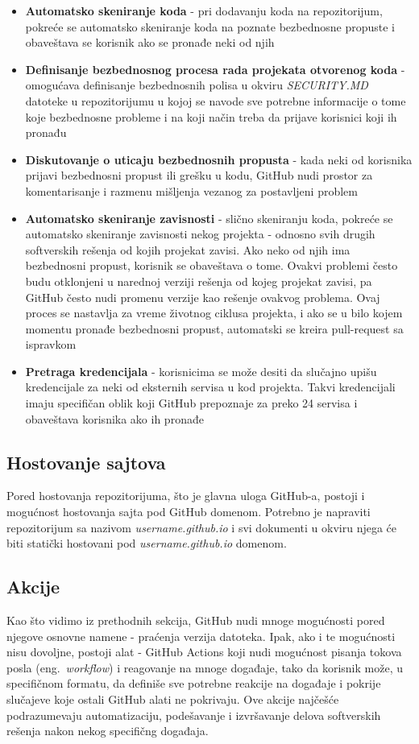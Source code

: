\documentclass[12pt]{report}
\begin{document}
\begin{itemize}
    \item \textbf{Automatsko skeniranje koda} - pri dodavanju koda na repozitorijum, pokreće se automatsko skeniranje koda na poznate bezbednosne propuste i obaveštava se korisnik ako se pronađe neki od njih
    \item \textbf{Definisanje bezbednosnog procesa rada projekata otvorenog koda} - omogućava definisanje bezbednosnih polisa u okviru \textit{SECURITY.MD} datoteke u repozitorijumu u kojoj se navode sve potrebne informacije o tome koje bezbednosne probleme i na koji način treba da prijave korisnici koji ih pronađu
    \item \textbf{Diskutovanje o uticaju bezbednosnih propusta} - kada neki od korisnika prijavi bezbednosni propust ili grešku u kodu, GitHub nudi prostor za komentarisanje i razmenu mišljenja vezanog za postavljeni problem
    \item \textbf{Automatsko skeniranje zavisnosti} - slično skeniranju koda, pokreće se automatsko skeniranje zavisnosti nekog projekta - odnosno svih drugih softverskih rešenja od kojih projekat zavisi. Ako neko od njih ima bezbednosni propust, korisnik se obaveštava o tome. Ovakvi problemi često budu otklonjeni u narednoj verziji rešenja od kojeg projekat zavisi, pa GitHub često nudi promenu verzije kao rešenje ovakvog problema. Ovaj proces se nastavlja za vreme životnog ciklusa projekta, i ako se u bilo kojem momentu pronađe bezbednosni propust, automatski se kreira pull-request sa ispravkom
    \item \textbf{Pretraga kredencijala} - korisnicima se može desiti da slučajno upišu kredencijale za neki od eksternih servisa u kod projekta. Takvi kredencijali imaju specifičan oblik koji GitHub prepoznaje za preko 24 servisa i obaveštava korisnika ako ih pronađe
\end{itemize}

\subsection{Hostovanje sajtova}
Pored hostovanja repozitorijuma, što je glavna uloga GitHub-a, postoji i mogućnost hostovanja sajta pod GitHub domenom. Potrebno je napraviti repozitorijum sa nazivom \textit{username.github.io} i svi dokumenti u okviru njega će biti statički hostovani pod \textit{username.github.io} domenom.

\subsection{Akcije}
Kao što vidimo iz prethodnih sekcija, GitHub nudi mnoge mogućnosti pored njegove osnovne namene - praćenja verzija datoteka. Ipak, ako i te mogućnosti nisu dovoljne, postoji alat - GitHub Actions koji nudi mogućnost pisanja tokova posla (eng.\ \textit{workflow}) i reagovanje na mnoge događaje, tako da korisnik može, u specifičnom formatu, da definiše sve potrebne reakcije na događaje i pokrije slučajeve koje ostali GitHub alati ne pokrivaju. Ove akcije najčešće podrazumevaju automatizaciju, podešavanje i izvršavanje delova softverskih rešenja nakon nekog specifičng događaja.
\end{document}
